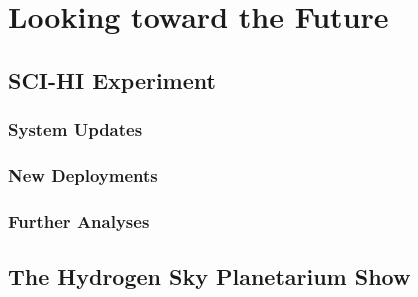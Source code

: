 \chapter{Looking toward the Future}\label{Ch:Conclude}

\section{SCI-HI Experiment}

\subsection{System Updates}

\subsection{New Deployments}

\subsection{Further Analyses}

\section{The Hydrogen Sky Planetarium Show}


